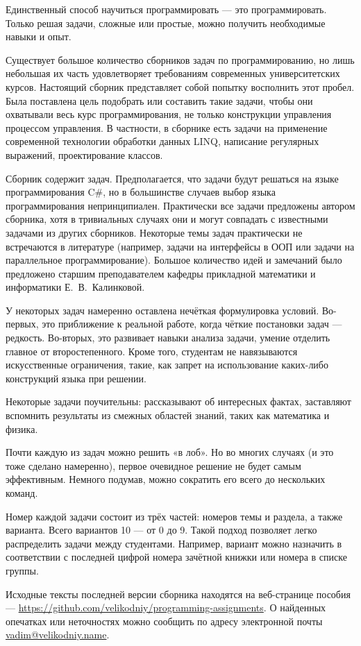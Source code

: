 
Единственный способ научиться программировать — это
программировать. Только решая задачи, сложные или простые, можно
получить необходимые навыки и опыт.

Существует большое количество сборников задач по программированию, но
лишь небольшая их часть удовлетворяет требованиям современных
университетских курсов. Настоящий сборник представляет собой попытку
восполнить этот пробел. Была поставлена цель подобрать или составить
такие задачи, чтобы они охватывали весь курс программирования, не
только конструкции управления процессом управления. В частности, в
сборнике есть задачи на применение современной технологии обработки
данных LINQ, написание регулярных выражений, проектирование классов.

Сборник содержит  задач. Предполагается, что задачи
будут решаться на языке программирования C\#, но в большинстве случаев
выбор языка программирования непринципиален. Практически все задачи
предложены автором сборника, хотя в тривиальных случаях они и могут
совпадать с известными задачами из других сборников. Некоторые темы
задач практически не встречаются в литературе (например, задачи на
интерфейсы в ООП или задачи на параллельное программирование). Большое
количество идей и замечаний было предложено старшим преподавателем
кафедры прикладной математики и информатики Е.~В.~Калинковой.

У некоторых задач намеренно оставлена нечёткая формулировка
условий. Во-первых, это приближение к реальной работе, когда чёткие
постановки задач — редкость. Во-вторых, это развивает навыки анализа
задачи, умение отделить главное от второстепенного. Кроме того,
студентам не навязываются искусственные ограничения, такие, как запрет
на использование каких-либо конструкций языка при решении.

Некоторые задачи поучительны: рассказывают об интересных фактах,
заставляют вспомнить результаты из смежных областей знаний, таких как
математика и физика.

Почти каждую из задач можно решить «в лоб». Но во многих случаях (и
это тоже сделано намеренно), первое очевидное решение не будет самым
эффективным. Немного подумав, можно сократить его всего до нескольких
команд.

Номер каждой задачи состоит из трёх частей: номеров темы и раздела, а
также варианта. Всего вариантов 10 — от 0 до 9. Такой подход позволяет
легко распределить задачи между студентами. Например, вариант можно
назначить в соответствии с последней цифрой номера зачётной книжки или
номера в списке группы.




Исходные тексты последней версии сборника находятся на веб-странице
пособия —
\url{https://github.com/velikodniy/programming-assignments}. О найденных
опечатках или неточностях можно сообщить по адресу электронной почты
\href{mailto:vadim@veikodniy.name}{vadim@velikodniy.name}.
